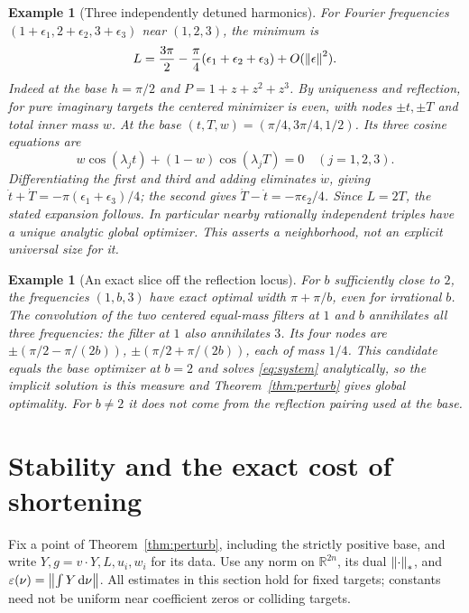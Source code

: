 \documentclass[11pt]{article}
\newtheorem{example}[theorem]{Example}
\theoremstyle{remark}\newtheorem{remark}[theorem]{Remark}
\newcommand{\R}{\mathbb R}\newcommand{\C}{\mathbb C}\newcommand{\supp}{\operatorname{supp}}
\begin{document}
\begin{example}[Three independently detuned harmonics]\label{ex:detune}
For Fourier frequencies $(1+\epsilon_1,2+\epsilon_2,3+\epsilon_3)$ near $(1,2,3)$, the minimum is
\[
 L=\frac{3\pi}{2}-\frac\pi4(\epsilon_1+\epsilon_2+\epsilon_3)+O(\left\|\epsilon\right\|^2).
\]
Indeed at the base $h=\pi/2$ and $P=1+z+z^2+z^3$. By uniqueness and reflection, for pure imaginary targets the centered minimizer is even, with nodes $\pm t,\pm T$ and total inner mass $w$. At the base $(t,T,w)=(\pi/4,3\pi/4,1/2)$. Its three cosine equations are
\begin{equation}\label{eq:cos}
 w\cos(\lambda_j t)+(1-w)\cos(\lambda_j T)=0\quad(j=1,2,3).
\end{equation}
Differentiating the first and third and adding eliminates $\dot w$, giving $\dot t+\dot T=-\pi(\epsilon_1+\epsilon_3)/4$; the second gives $\dot T-\dot t=-\pi\epsilon_2/4$. Since $L=2T$, the stated expansion follows. In particular nearby rationally independent triples have a unique analytic global optimizer. This asserts a neighborhood, not an explicit universal size for it.
\end{example}
\begin{example}[An exact slice off the reflection locus]
For $b$ sufficiently close to $2$, the frequencies $(1,b,3)$ have exact optimal width $\pi+\pi/b$, even for irrational $b$. The convolution of the two centered equal-mass filters at $1$ and $b$ annihilates all three frequencies: the filter at $1$ also annihilates $3$. Its four nodes are $\pm(\pi/2-\pi/(2b))$, $\pm(\pi/2+\pi/(2b))$, each of mass $1/4$. This candidate equals the base optimizer at $b=2$ and solves \eqref{eq:system} analytically, so the implicit solution is this measure and Theorem~\ref{thm:perturb} gives global optimality. For $b\ne2$ it does not come from the reflection pairing used at the base.
\end{example}

\section{Stability and the exact cost of shortening}
Fix a point of Theorem~\ref{thm:perturb}, including the strictly positive base, and write $Y,g=v\cdot Y,L,u_i,w_i$ for its data. Use any norm on $\R^{2n}$, its dual $\left\|\cdot\right\|_*$, and $\varepsilon(\nu)=\left\|\int Y\,\mathrm d\nu\right\|$. All estimates in this section hold for fixed targets; constants need not be uniform near coefficient zeros or colliding targets.
\end{document}
